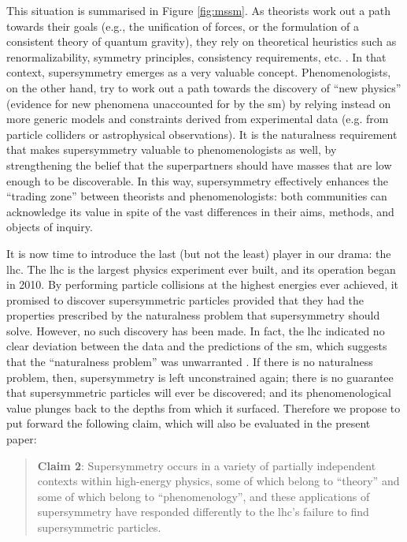 \documentclass[smallextended]{svjour3}
\begin{document}
This situation is summarised in Figure \ref{fig:mssm}. As theorists work out a path towards their goals (e.g., the unification of forces, or the formulation of a consistent theory of quantum gravity), they rely on theoretical heuristics such as renormalizability, symmetry principles, consistency requirements, etc. \citep{Galison1995}. In that context, supersymmetry emerges as a very valuable concept. Phenomenologists, on the other hand, try to work out a path towards the discovery of ``new physics'' (evidence for new phenomena unaccounted for by the \gls{sm}) by relying instead on more generic models and constraints derived from experimental data (e.g. from particle colliders or astrophysical observations). It is the naturalness requirement that makes supersymmetry valuable to phenomenologists as well, by strengthening the belief that the superpartners should have masses that are low enough to be discoverable. In this way, supersymmetry effectively enhances the ``trading zone'' between theorists and phenomenologists: both communities can acknowledge its value in spite of the vast differences in their aims, methods, and objects of inquiry.%

It is now time to introduce the last (but not the least) player in our drama: the \gls{lhc}. The \gls{lhc} is the largest physics experiment ever built, and its operation began in 2010. By performing particle collisions at the highest energies ever achieved, it promised to discover supersymmetric particles provided that they had the properties prescribed by the naturalness problem that supersymmetry should solve. However, no such discovery has been made. In fact, the \gls{lhc} indicated no clear deviation between the data and the predictions of the \gls{sm}, which suggests that the ``naturalness problem'' was unwarranted \citep{Giudice2017}. If there is no naturalness problem, then, supersymmetry is left unconstrained again; there is no guarantee that supersymmetric particles will ever be discovered; and its phenomenological value plunges back to the depths from which it surfaced. Therefore we propose to put forward the following claim, which will also be evaluated in the present paper:

\begin{quote}
    \textbf{Claim 2}: Supersymmetry occurs in a variety of partially independent contexts within high-energy physics, some of which belong to ``theory'' and some of which belong to ``phenomenology'', and these applications of supersymmetry have responded differently to the \gls{lhc}'s failure to find supersymmetric particles.
\end{quote}
\end{document}
